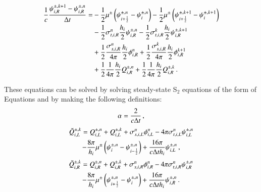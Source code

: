 \documentclass[preprint,12pt]{elsarticle}
\begin{document}
\begin{equation}\begin{split}
\frac{1}{c}\frac{\psi\iR^{\pm,k+1}-\psi\iR^{\pm,n}}{\dt} = &
  -\half\mu^\pm\fn{\psi^{\pm,n}_{i+\half} - \psi^{\pm,n}_i}
  -\half\mu^\pm\fn{\psi^{\pm,k+1}_{i+\half} - \psi^{\pm,k+1}_i}\\
  &-\half\sigma_{t,i,R}^n\frac{h_i}{2}\psi\iR^{\pm,n}
   -\half\sigma_{t,i,R}^k\frac{h_i}{2}\psi\iR^{\pm,k+1}\\
  &+\half\frac{\sigma_{s,i,R}^n}{4\pi}\frac{h_i}{2}\phi\iR^n
   +\half\frac{\sigma_{s,i,R}^k}{4\pi}\frac{h_i}{2}\phi\iR^{k+1}\\
  &+\half\frac{1}{4\pi}\frac{h_i}{2}Q_{i,R}^{\pm,n}
   +\half\frac{1}{4\pi}\frac{h_i}{2}Q_{i,R}^{\pm,k} \pep
\lequ{S2CNfullR}
\end{split}\end{equation}

These equations can be solved by solving steady-state S$_2$ equations
of the form of Equations  and  by making
the following definitions:
\begin{equation}
\alpha = \frac{2}{c\Delta t} \, ,
\end{equation}
\begin{multline}
\tilde{Q}_{i,L}^{\pm,k} = Q_{i,L}^{\pm,n} + Q_{i,L}^{\pm,k}
  + \sigma_{s,i,L}^n \phi_{i,L}^n - 4\pi\sigma_{t,i,L}^n \psi_{i,L}^{\pm,n}\\
  - \frac{8\pi}{h_i}\mu^\pm\left( \psi^{\pm,n}_i - \psi^{\pm,n}_{i-\frac{1}{2}} \right)
  + \frac{16\pi}{c\Delta t h_i}\psi_{i,L}^{\pm,n} \, ,
\end{multline}
\begin{multline}
\tilde{Q}_{i,R}^{\pm,k} = Q_{i,R}^{\pm,n} + Q_{i,R}^{\pm,k}
  + \sigma_{s,i,R}^n \phi_{i,R}^n - 4\pi\sigma_{t,i,R}^n \psi_{i,R}^{\pm,n}\\
  - \frac{8\pi}{h_i}\mu^\pm\left( \psi^{\pm,n}_{i+\frac{1}{2}} - \psi^{\pm,n}_i \right)
  + \frac{16\pi}{c\Delta t h_i}\psi_{i,R}^{\pm,n} \, .
\end{multline}
\end{document}
